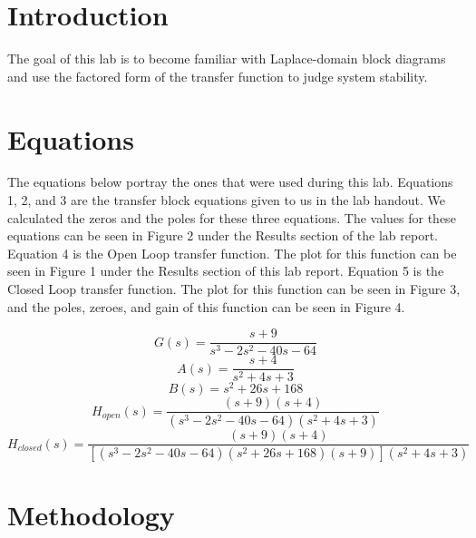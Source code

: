 \documentclass[12pt]{report}
\begin{document}
\section{Introduction}
 

The goal of this lab is to become familiar with Laplace-domain block diagrams and use the factored form of the transfer function to judge system stability.

\section{Equations}

The equations below portray the ones that were used during this lab. Equations 1, 2, and 3 are the  transfer block equations given to us in the lab handout. We calculated the zeros and the poles for these three equations. The values for these equations can be seen in Figure 2 under the Results section of the lab report. Equation 4 is the Open Loop transfer function. The plot for this function can be seen in Figure 1 under the Results section of this lab report. Equation 5 is the Closed Loop transfer function. The plot for this function can be seen in Figure 3, and the poles, zeroes, and gain of this function can be seen in Figure 4.  

\begin{equation}
    G(s) = \frac{s+9}{s^{3} -2s^{2}-40s-64}
\end{equation}
\begin{equation}
    A(s) = \frac{s+4}{s^{2}+4s+3}
\end{equation}
\begin{equation}
   B(s) = s^{2}+26s+168
\end{equation}
\begin{equation}
  H_{open}(s) = \frac{(s+9)(s+4)}{(s^{3}-2s^{2}-40s-64)(s^{2}+4s+3)}
\end{equation}
\begin{equation}
   H_{closed}(s) = \frac{(s+9)(s+4)}{[(s^{3}-2s^{2}-40s-64)(s^{2}+26s+168)(s+9)](s^{2}+4s+3)}
\end{equation}



\section{Methodology}
\end{document}
